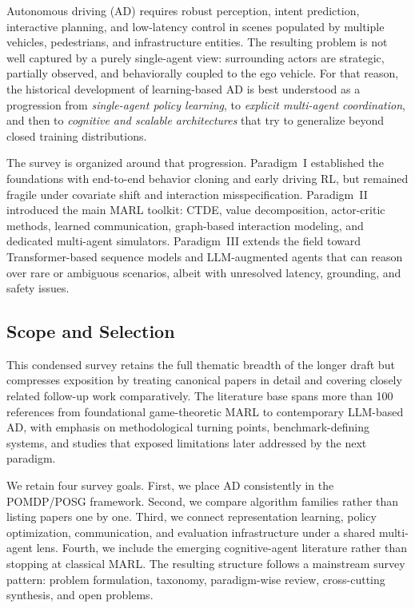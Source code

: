 \documentclass[12pt, a4paper]{article}
\begin{document}
Autonomous driving (AD) requires robust perception, intent prediction,
interactive planning, and low-latency control in scenes populated by multiple
vehicles, pedestrians, and infrastructure entities. The resulting problem is not
well captured by a purely single-agent view: surrounding actors are strategic,
partially observed, and behaviorally coupled to the ego vehicle. For that
reason, the historical development of learning-based AD is best understood as a
progression from \emph{single-agent policy learning}, to \emph{explicit
multi-agent coordination}, and then to \emph{cognitive and scalable
architectures} that try to generalize beyond closed training distributions.

The survey is organized around that progression. Paradigm~I established the
foundations with end-to-end behavior cloning and early driving RL, but remained
fragile under covariate shift and interaction misspecification. Paradigm~II
introduced the main MARL toolkit: CTDE, value decomposition, actor-critic
methods, learned communication, graph-based interaction modeling, and dedicated
multi-agent simulators. Paradigm~III extends the field toward Transformer-based
sequence models and LLM-augmented agents that can reason over rare or ambiguous
scenarios, albeit with unresolved latency, grounding, and safety issues.

\subsection{Scope and Selection}
\label{sec:scope}

This condensed survey retains the full thematic breadth of the longer draft but
compresses exposition by treating canonical papers in detail and covering closely
related follow-up work comparatively. The literature base spans more than 100
references from foundational game-theoretic MARL to contemporary LLM-based AD,
with emphasis on methodological turning points, benchmark-defining systems, and
studies that exposed limitations later addressed by the next paradigm.

We retain four survey goals. First, we place AD consistently in the POMDP/POSG
framework. Second, we compare algorithm families rather than listing papers one
by one. Third, we connect representation learning, policy optimization,
communication, and evaluation infrastructure under a shared multi-agent lens.
Fourth, we include the emerging cognitive-agent literature rather than stopping
at classical MARL. The resulting structure follows a mainstream survey pattern:
problem formulation, taxonomy, paradigm-wise review, cross-cutting synthesis,
and open problems.
\end{document}
